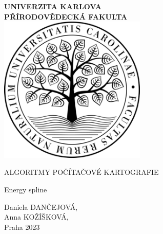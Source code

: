 \documentclass[11pt, a4paper]{report}
\begin{document}
\begin{titlepage}
    \centering
        {\bfseries\Large
            UNIVERZITA KARLOVA\\
            PŘÍRODOVĚDECKÁ FAKULTA\\
            \vskip2cm
        } 
        \vfill
             \includegraphics[width=7cm]{logo_natur} %
        \vfill
        {\bfseries\Large
            \vskip2cm
            {\Large ALGORITMY POČÍTAČOVÉ KARTOGRAFIE\par}
            \vskip0.3cm
            Energy spline\\
            \vskip4.5cm
        }
\vfill
    {\large\raggedleft Daniela DANČEJOVÁ, \\Anna KOŽÍŠKOVÁ, \\Praha 2023\par} 
\vfill
\vfill
\end{titlepage}







\end{document}
